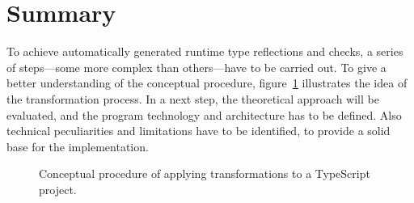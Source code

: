 \section{Summary}
\label{sec:theoretical-approach-summary}

To achieve automatically generated runtime type reflections and checks, a series of steps---some more complex than others---have to be carried out. To give a better understanding of the conceptual procedure, figure~\ref{fig:theoretical-approach} illustrates the idea of the transformation process. In a next step, the theoretical approach will be evaluated, and the program technology and architecture has to be defined. Also technical peculiarities and limitations have to be identified, to provide a solid base for the implementation.
\begin{figure}
\centering

\caption{Conceptual procedure of applying transformations to a TypeScript project.}
\label{fig:theoretical-approach}
\end{figure}


%





